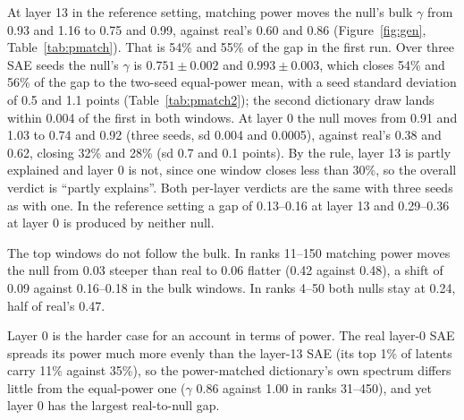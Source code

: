 \documentclass{article}
\begin{document}
At layer 13 in the reference setting, matching power moves the null's bulk $\gamma$ from 0.93 and 1.16 to 0.75 and 0.99, against real's 0.60 and 0.86 (Figure~\ref{fig:gen}, Table~\ref{tab:pmatch}). That is 54\% and 55\% of the gap in the first run. Over three SAE seeds the null's $\gamma$ is $0.751\pm0.002$ and $0.993\pm0.003$, which closes 54\% and 56\% of the gap to the two-seed equal-power mean, with a seed standard deviation of 0.5 and 1.1 points (Table~\ref{tab:pmatch2}); the second dictionary draw lands within 0.004 of the first in both windows. At layer 0 the null moves from 0.91 and 1.03 to 0.74 and 0.92 (three seeds, sd 0.004 and 0.0005), against real's 0.38 and 0.62, closing 32\% and 28\% (sd 0.7 and 0.1 points). By the rule, layer 13 is partly explained and layer 0 is not, since one window closes less than 30\%, so the overall verdict is ``partly explains''. Both per-layer verdicts are the same with three seeds as with one. In the reference setting a gap of 0.13--0.16 at layer 13 and 0.29--0.36 at layer 0 is produced by neither null.

The top windows do not follow the bulk. In ranks 11--150 matching power moves the null from 0.03 steeper than real to 0.06 flatter (0.42 against 0.48), a shift of 0.09 against 0.16--0.18 in the bulk windows. In ranks 4--50 both nulls stay at 0.24, half of real's 0.47.

Layer 0 is the harder case for an account in terms of power. The real layer-0 SAE spreads its power much more evenly than the layer-13 SAE (its top 1\% of latents carry 11\% against 35\%), so the power-matched dictionary's own spectrum differs little from the equal-power one ($\gamma$ 0.86 against 1.00 in ranks 31--450), and yet layer 0 has the largest real-to-null gap.
\end{document}

